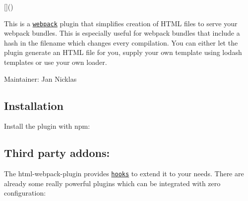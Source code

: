 \href{http://badge.fury.io/js/html-webpack-plugin}{\tt } \href{https://david-dm.org/jantimon/html-webpack-plugin}{\tt } \href{https://travis-ci.org/jantimon/html-webpack-plugin}{\tt } \href{https://ci.appveyor.com/project/jantimon/html-webpack-plugin}{\tt } \href{https://github.com/Flet/semistandard}{\tt } \href{https://www.bithound.io/github/jantimon/html-webpack-plugin/master/dependencies/npm}{\tt } \mbox{[}\mbox{]}()

\href{https://nodei.co/npm/html-webpack-plugin/}{\tt }

This is a \href{http://webpack.github.io/}{\tt webpack} plugin that simplifies creation of H\+T\+ML files to serve your webpack bundles. This is especially useful for webpack bundles that include a hash in the filename which changes every compilation. You can either let the plugin generate an H\+T\+ML file for you, supply your own template using lodash templates or use your own loader.

Maintainer\+: Jan Nicklas \href{https://twitter.com/jantimon}{\tt }

\subsection*{Installation }

Install the plugin with npm\+: 


\subsection*{Third party addons\+: }

The html-\/webpack-\/plugin provides \href{https://github.com/jantimon/html-webpack-plugin#events}{\tt hooks} to extend it to your needs. There are already some really powerful plugins which can be integrated with zero configuration\+:


